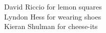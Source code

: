 \documentclass[preview]{standalone}
\begin{document}
David Riccio for lemon squares\\Lyndon Hess for wearing shoes\\Kieran Shulman for cheese-its\\
\end{document}
